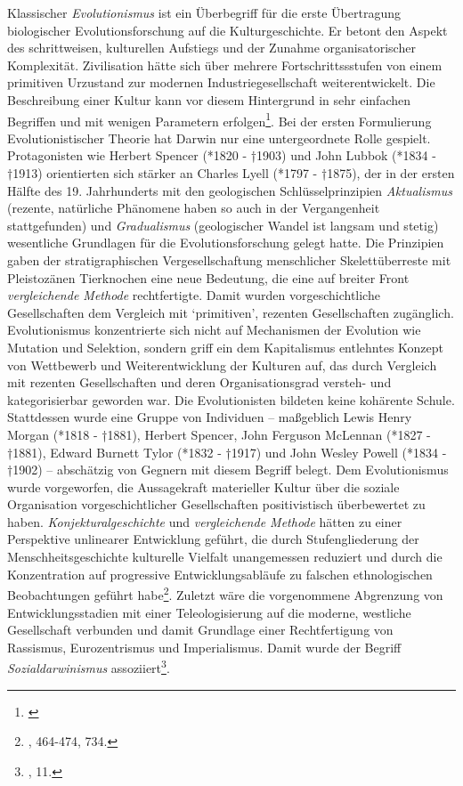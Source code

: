 \documentclass[openany,twoside,twocolumn]{book}
\let\rmarkdownfootnote\footnote%
\def\footnote{\protect\rmarkdownfootnote}
\begin{document}
Klassischer \emph{Evolutionismus} ist ein Überbegriff für die erste
Übertragung biologischer Evolutionsforschung auf die Kulturgeschichte.
Er betont den Aspekt des schrittweisen, kulturellen Aufstiegs und der
Zunahme organisatorischer Komplexität. Zivilisation hätte sich über
mehrere Fortschrittssstufen von einem primitiven Urzustand zur modernen
Industriegesellschaft weiterentwickelt. Die Beschreibung einer Kultur
kann vor diesem Hintergrund in sehr einfachen Begriffen und mit wenigen
Parametern erfolgen\footnote{\textcite{noauthor_evolutionismus_1986}}.
Bei der ersten Formulierung Evolutionistischer Theorie hat Darwin nur
eine untergeordnete Rolle gespielt. Protagonisten wie Herbert Spencer
(*1820 - †1903) und John Lubbok (*1834 - †1913) orientierten sich
stärker an Charles Lyell (*1797 - †1875), der in der ersten Hälfte des
19. Jahrhunderts mit den geologischen Schlüsselprinzipien
\emph{Aktualismus} (rezente, natürliche Phänomene haben so auch in der
Vergangenheit stattgefunden) und \emph{Gradualismus} (geologischer
Wandel ist langsam und stetig) wesentliche Grundlagen für die
Evolutionsforschung gelegt hatte. Die Prinzipien gaben der
stratigraphischen Vergesellschaftung menschlicher Skelettüberreste mit
Pleistozänen Tierknochen eine neue Bedeutung, die eine auf breiter Front
\emph{vergleichende Methode} rechtfertigte. Damit wurden
vorgeschichtliche Gesellschaften dem Vergleich mit `primitiven',
rezenten Gesellschaften zugänglich. Evolutionismus konzentrierte sich
nicht auf Mechanismen der Evolution wie Mutation und Selektion, sondern
griff ein dem Kapitalismus entlehntes Konzept von Wettbewerb und
Weiterentwicklung der Kulturen auf, das durch Vergleich mit rezenten
Gesellschaften und deren Organisationsgrad versteh- und kategorisierbar
geworden war. Die Evolutionisten bildeten keine kohärente Schule.
Stattdessen wurde eine Gruppe von Individuen -- maßgeblich Lewis Henry
Morgan (*1818 - †1881), Herbert Spencer, John Ferguson McLennan (*1827 -
†1881), Edward Burnett Tylor (*1832 - †1917) und John Wesley Powell
(*1834 - †1902) -- abschätzig von Gegnern mit diesem Begriff belegt. Dem
Evolutionismus wurde vorgeworfen, die Aussagekraft materieller Kultur
über die soziale Organisation vorgeschichtlicher Gesellschaften
positivistisch überbewertet zu haben. \emph{Konjekturalgeschichte} und
\emph{vergleichende Methode} hätten zu einer Perspektive unlinearer
Entwicklung geführt, die durch Stufengliederung der
Menschheitsgeschichte kulturelle Vielfalt unangemessen reduziert und
durch die Konzentration auf progressive Entwicklungsabläufe zu falschen
ethnologischen Beobachtungen geführt habe\footnote{\textcite{petermann_geschichte_2004},
  464-474, 734.}. Zuletzt wäre die vorgenommene Abgrenzung von
Entwicklungsstadien mit einer Teleologisierung auf die moderne,
westliche Gesellschaft verbunden und damit Grundlage einer
Rechtfertigung von Rassismus, Eurozentrismus und Imperialismus. Damit
wurde der Begriff \emph{Sozialdarwinismus} assoziiert\footnote{\textcite{ShennanGenesmemeshuman2002},
  11.}.
\end{document}
